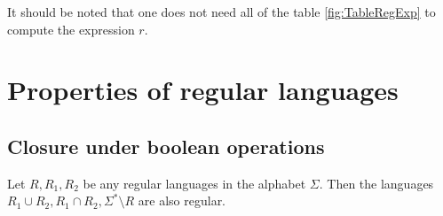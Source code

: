 \begin{page}
\begin{exl}
It should be noted that one does not need all of the table \ref{fig:TableRegExp} to compute the expression $r$.
\end{exl}

\end{page}

\begin{page}
\setcounter{section}{3}
\setcounter{subsection}{1}
\setcounter{dfn}{0}
\label{portion:1109}

\section{Properties of regular languages}

\end{page}

\begin{page}
\setcounter{section}{3}
\setcounter{subsection}{1}
\setcounter{dfn}{0}
\label{portion:1111}

\subsection{Closure under boolean operations}

\end{page}

\begin{page}
\setcounter{section}{3}
\setcounter{subsection}{1}
\setcounter{dfn}{1}
\label{portion:1113}

\begin{thm}
\label{thm:ClosRegLang}
Let $R, R_1, R_2$ be any regular languages in the alphabet $\Sigma$.
Then the languages $R_1 \cup R_2, R_1 \cap R_2, \Sigma^* \setminus R$ are also regular.
\end{thm}

\end{page}


